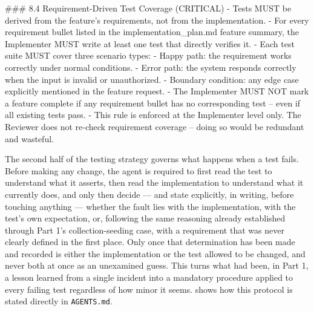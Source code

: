 \begin{listing}[H]
\begin{center}
\begin{promptbox}
### 8.4 Requirement-Driven Test Coverage (CRITICAL)
- Tests MUST be derived from the feature's requirements, not from the implementation.
- For every requirement bullet listed in the implementation_plan.md feature summary, the Implementer MUST write at least one test that directly verifies it.
- Each test suite MUST cover three scenario types:
  - Happy path: the requirement works correctly under normal conditions.
  - Error path: the system responds correctly when the input is invalid or unauthorized.
  - Boundary condition: any edge case explicitly mentioned in the feature request.
- The Implementer MUST NOT mark a feature complete if any requirement bullet has no corresponding test -- even if all existing tests pass.
- This rule is enforced at the Implementer level only. The Reviewer does not re-check requirement coverage -- doing so would be redundant and wasteful.
\end{promptbox}
\end{center}
\caption{Excerpt of \texttt{AGENTS.md} defining the requirement-driven test coverage rule.}
\label{lst:requirement-driven-coverage}
\end{listing}

The second half of the testing strategy governs what happens when a test fails. Before making any change, the agent is required to first read the test to understand what it asserts, then read the implementation to understand what it currently does, and only then decide --- and state explicitly, in writing, before touching anything --- whether the fault lies with the implementation, with the test's own expectation, or, following the same reasoning already established through Part 1's collection-seeding case, with a requirement that was never clearly defined in the first place. Only once that determination has been made and recorded is either the implementation or the test allowed to be changed, and never both at once as an unexamined guess. This turns what had been, in Part 1, a lesson learned from a single incident into a mandatory procedure applied to every failing test regardless of how minor it seems.  shows how this protocol is stated directly in \texttt{AGENTS.md}.

